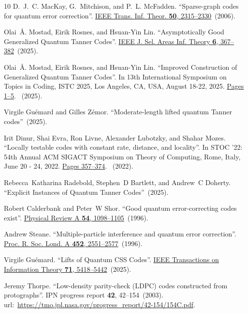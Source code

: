 \documentclass[a4paper,onecolumn,11pt]{quantumarticle}
\begin{document}
\begin{thebibliography}{10}
D.~J.~C. MacKay, G.~Mitchison, and P.~L. McFadden.
\newblock ``Sparse-graph codes for quantum error correction''.
\newblock \href{https://dx.doi.org/10.1109/TIT.2004.834737}{IEEE Trans. Inf.
  Theor. {\bf 50}, 2315–2330}~(2006).

Olai~{\AA}. Mostad, Eirik Rosnes, and Hsuan{-}Yin Lin.
\newblock ``{Asymptotically Good Generalized Quantum Tanner Codes}''.
\newblock \href{https://dx.doi.org/10.1109/JSAIT.2025.3594310}{{IEEE} J. Sel.
  Areas Inf. Theory {\bf 6}, 367--382}~(2025).

Olai~{\AA}. Mostad, Eirik Rosnes, and Hsuan{-}Yin Lin.
\newblock ``{Improved Construction of Generalized Quantum Tanner Codes}''.
\newblock In 13th International Symposium on Topics in Coding, {ISTC} 2025, Los
  Angeles, CA, USA, August 18-22, 2025.
\newblock \href{https://dx.doi.org/10.1109/ISTC65386.2025.11154489}{Pages
  1--5}.
~(2025).

Virgile Gu{\'e}mard and Gilles Z{\'e}mor.
\newblock ``{Moderate-length lifted quantum Tanner codes}''~(2025).

Irit Dinur, Shai Evra, Ron Livne, Alexander Lubotzky, and Shahar Mozes.
\newblock ``Locally testable codes with constant rate, distance, and
  locality''.
\newblock In {STOC} '22: 54th Annual {ACM} {SIGACT} Symposium on Theory of
  Computing, Rome, Italy, June 20 - 24, 2022.
\newblock \href{https://dx.doi.org/10.1145/3519935.3520024}{Pages 357--374}.
~(2022).

Rebecca~Katharina Radebold, Stephen~D Bartlett, and Andrew~C Doherty.
\newblock ``{Explicit Instances of Quantum Tanner Codes}''~(2025).

Robert Calderbank and Peter~W Shor.
\newblock ``Good quantum error-correcting codes exist''.
\newblock \href{https://dx.doi.org/10.1103/PhysRevA.54.1098}{Physical Review A
  {\bf 54}, 1098--1105}~(1996).

Andrew Steane.
\newblock ``Multiple-particle interference and quantum error correction''.
\newblock \href{https://dx.doi.org/10.1098/rspa.1996.0136}{Proc. R. Soc. Lond.
  A {\bf 452}, 2551--2577}~(1996).

Virgile Gu{\'e}mard.
\newblock ``{Lifts of Quantum CSS Codes}''.
\newblock \href{https://dx.doi.org/10.1109/TIT.2025.3552211}{IEEE Transactions
  on Information Theory {\bf 71}, 5418--5442}~(2025).

Jeremy Thorpe.
\newblock ``{Low-density parity-check (LDPC) codes constructed from
  protographs}''.
\newblock IPN progress report {\bf 42}, 42--154~(2003).
\newblock  url:~\url{https://tmo.jpl.nasa.gov/progress_report/42-154/154C.pdf}.


\end{thebibliography}
\end{document}
